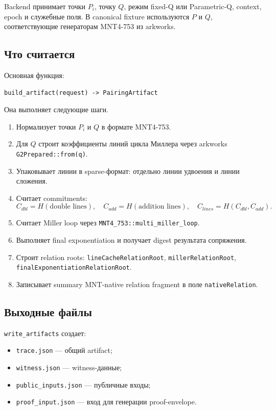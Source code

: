 \documentclass[12pt,a4paper]{article}
\begin{document}
Backend принимает точки $P_i$, точку $Q$, режим fixed-Q или Parametric-Q, context, epoch и служебные поля. В canonical fixture используются $P$ и $Q$, соответствующие генераторам MNT4-753 из arkworks.

\subsection{Что считается}
Основная функция:
\begin{lstlisting}
build_artifact(request) -> PairingArtifact
\end{lstlisting}

Она выполняет следующие шаги.
\begin{enumerate}
    \item Нормализует точки $P_i$ и $Q$ в формате MNT4-753.
    \item Для $Q$ строит коэффициенты линий цикла Миллера через arkworks \texttt{G2Prepared::from(q)}.
    \item Упаковывает линии в sparse-формат: отдельно линии удвоения и линии сложения.
    \item Считает commitments:
    \[
        C_{dbl}=H(\text{double lines}),\quad
        C_{add}=H(\text{addition lines}),\quad
        C_{lines}=H(C_{dbl},C_{add}).
    \]
    \item Считает Miller loop через \texttt{MNT4\_753::multi\_miller\_loop}.
    \item Выполняет final exponentiation и получает digest результата сопряжения.
    \item Строит relation roots: \texttt{lineCacheRelationRoot}, \texttt{millerRelationRoot}, \texttt{finalExponentiationRelationRoot}.
    \item Записывает summary MNT-native relation fragment в поле \texttt{nativeRelation}.
\end{enumerate}


\subsection{Выходные файлы}
\texttt{write\_artifacts} создает:
\begin{itemize}
    \item \texttt{trace.json} --- общий artifact;
    \item \texttt{witness.json} --- witness-данные;
    \item \texttt{public\_inputs.json} --- публичные входы;
    \item \texttt{proof\_input.json} --- вход для генерации proof-envelope.
\end{itemize}
\end{document}
